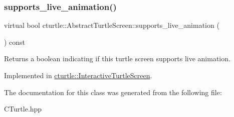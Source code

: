 \subsubsection{\texorpdfstring{supports\+\_\+live\+\_\+animation()}{supports\_live\_animation()}}
{\footnotesize\ttfamily virtual bool cturtle\+::\+Abstract\+Turtle\+Screen\+::supports\+\_\+live\+\_\+animation (\begin{DoxyParamCaption}{ }\end{DoxyParamCaption}) const\hspace{0.3cm}{\ttfamily [pure virtual]}}

\begin{DoxyReturn}{Returns}
a boolean indicating if this turtle screen supports live animation. 
\end{DoxyReturn}


Implemented in \hyperlink{classcturtle_1_1InteractiveTurtleScreen_ad28f7c6e4058541a2c4258b4455fad74}{cturtle\+::\+Interactive\+Turtle\+Screen}.



The documentation for this class was generated from the following file\+:\begin{DoxyCompactItemize}
\item 
C\+Turtle.\+hpp\end{DoxyCompactItemize}
